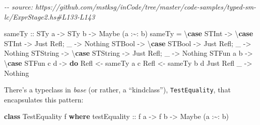 \documentclass[]{article}
\newenvironment{Shaded}{}{}
\newcommand{\CommentTok}[1]{\textcolor[rgb]{0.38,0.63,0.69}{\textit{#1}}}
\newcommand{\DataTypeTok}[1]{\textcolor[rgb]{0.56,0.13,0.00}{#1}}
\newcommand{\KeywordTok}[1]{\textcolor[rgb]{0.00,0.44,0.13}{\textbf{#1}}}
\newcommand{\NormalTok}[1]{#1}
\newcommand{\OperatorTok}[1]{\textcolor[rgb]{0.40,0.40,0.40}{#1}}
\newcommand{\OtherTok}[1]{\textcolor[rgb]{0.00,0.44,0.13}{#1}}
\begin{document}
\begin{Shaded}
\begin{Highlighting}[]
\CommentTok{{-}{-} source: https://github.com/mstksg/inCode/tree/master/code{-}samples/typed{-}sm{-}lc/ExprStage2.hs\#L133{-}L143}

\OtherTok{sameTy ::} \DataTypeTok{STy}\NormalTok{ a }\OtherTok{{-}\textgreater{}} \DataTypeTok{STy}\NormalTok{ b }\OtherTok{{-}\textgreater{}} \DataTypeTok{Maybe}\NormalTok{ (a }\OperatorTok{:\textasciitilde{}:}\NormalTok{ b)}
\NormalTok{sameTy }\OtherTok{=}\NormalTok{ \textbackslash{}}\KeywordTok{case}
  \DataTypeTok{STInt} \OtherTok{{-}\textgreater{}}\NormalTok{ \textbackslash{}}\KeywordTok{case} \DataTypeTok{STInt} \OtherTok{{-}\textgreater{}} \DataTypeTok{Just} \DataTypeTok{Refl}\NormalTok{; \_ }\OtherTok{{-}\textgreater{}} \DataTypeTok{Nothing}
  \DataTypeTok{STBool} \OtherTok{{-}\textgreater{}}\NormalTok{ \textbackslash{}}\KeywordTok{case} \DataTypeTok{STBool} \OtherTok{{-}\textgreater{}} \DataTypeTok{Just} \DataTypeTok{Refl}\NormalTok{; \_ }\OtherTok{{-}\textgreater{}} \DataTypeTok{Nothing}
  \DataTypeTok{STString} \OtherTok{{-}\textgreater{}}\NormalTok{ \textbackslash{}}\KeywordTok{case} \DataTypeTok{STString} \OtherTok{{-}\textgreater{}} \DataTypeTok{Just} \DataTypeTok{Refl}\NormalTok{; \_ }\OtherTok{{-}\textgreater{}} \DataTypeTok{Nothing}
  \DataTypeTok{STFun}\NormalTok{ a b }\OtherTok{{-}\textgreater{}}\NormalTok{ \textbackslash{}}\KeywordTok{case}
    \DataTypeTok{STFun}\NormalTok{ c d }\OtherTok{{-}\textgreater{}} \KeywordTok{do}
      \DataTypeTok{Refl} \OtherTok{\textless{}{-}}\NormalTok{ sameTy a c}
      \DataTypeTok{Refl} \OtherTok{\textless{}{-}}\NormalTok{ sameTy b d}
      \DataTypeTok{Just} \DataTypeTok{Refl}
\NormalTok{    \_ }\OtherTok{{-}\textgreater{}} \DataTypeTok{Nothing}
\end{Highlighting}
\end{Shaded}

There's a typeclass in \emph{base} (or rather, a ``kindclass''),
\texttt{TestEquality}, that encapsulates this pattern:

\begin{Shaded}
\begin{Highlighting}[]
\KeywordTok{class} \DataTypeTok{TestEquality}\NormalTok{ f }\KeywordTok{where}
\OtherTok{    testEquality ::}\NormalTok{ f a }\OtherTok{{-}\textgreater{}}\NormalTok{ f b }\OtherTok{{-}\textgreater{}} \DataTypeTok{Maybe}\NormalTok{ (a }\OperatorTok{:\textasciitilde{}:}\NormalTok{ b)}
\end{Highlighting}
\end{Shaded}
\end{document}
